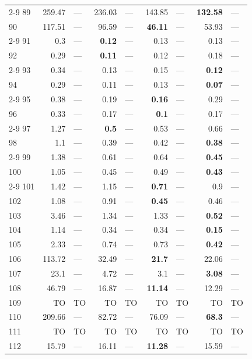 \begin{longtable}{lr@{\hskip 4pt}l@{\hskip 12pt}r@{\hskip 4pt}l@{\hskip 12pt}r@{\hskip 4pt}l@{\hskip 12pt}r@{\hskip 4pt}l@{\hskip 12pt}}
\cmidrule{2-9}
89 & 259.47 & --- & 236.03 & --- & 143.85 & --- & \textbf{132.58} & --- \\
90 & 117.51 & --- & 96.59 & --- & \textbf{46.11} & --- & 53.93 & --- \\
\cmidrule{2-9}
91 & 0.3 & --- & \textbf{0.12} & --- & 0.13 & --- & 0.13 & --- \\
92 & 0.29 & --- & \textbf{0.11} & --- & 0.12 & --- & 0.18 & --- \\
\cmidrule{2-9}
93 & 0.34 & --- & 0.13 & --- & 0.15 & --- & \textbf{0.12} & --- \\
94 & 0.29 & --- & 0.11 & --- & 0.13 & --- & \textbf{0.07} & --- \\
\cmidrule{2-9}
95 & 0.38 & --- & 0.19 & --- & \textbf{0.16} & --- & 0.29 & --- \\
96 & 0.33 & --- & 0.17 & --- & \textbf{0.1} & --- & 0.17 & --- \\
\cmidrule{2-9}
97 & 1.27 & --- & \textbf{0.5} & --- & 0.53 & --- & 0.66 & --- \\
98 & 1.1 & --- & 0.39 & --- & 0.42 & --- & \textbf{0.38} & --- \\
\cmidrule{2-9}
99 & 1.38 & --- & 0.61 & --- & 0.64 & --- & \textbf{0.45} & --- \\
100 & 1.05 & --- & 0.45 & --- & 0.49 & --- & \textbf{0.43} & --- \\
\cmidrule{2-9}
101 & 1.42 & --- & 1.15 & --- & \textbf{0.71} & --- & 0.9 & --- \\
102 & 1.08 & --- & 0.91 & --- & \textbf{0.45} & --- & 0.46 & --- \\
\midrule
103 & 3.46 & --- & 1.34 & --- & 1.33 & --- & \textbf{0.52} & --- \\
104 & 1.14 & --- & 0.34 & --- & 0.34 & --- & \textbf{0.15} & --- \\
105 & 2.33 & --- & 0.74 & --- & 0.73 & --- & \textbf{0.42} & --- \\
106 & 113.72 & --- & 32.49 & --- & \textbf{21.7} & --- & 22.06 & --- \\
107 & 23.1 & --- & 4.72 & --- & 3.1 & --- & \textbf{3.08} & --- \\
108 & 46.79 & --- & 16.87 & --- & \textbf{11.14} & --- & 12.29 & --- \\
109 & TO & TO & TO & TO & TO & TO & TO & TO \\
110 & 209.66 & --- & 82.72 & --- & 76.09 & --- & \textbf{68.3} & --- \\
111 & TO & TO & TO & TO & TO & TO & TO & TO \\
112 & 15.79 & --- & 16.11 & --- & \textbf{11.28} & --- & 15.59 & --- \\

\end{longtable}
